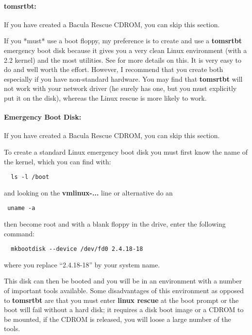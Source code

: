 \paragraph*{tomsrtbt:}

If you have created a Bacula Rescue CDROM, you can skip this section. 

If you *must* use a boot floppy, my preference is to create and use a {\bf
tomsrtbt} emergency boot disk because it gives you a very clean Linux
environment (with a 2.2 kernel) and the most utilities. See 
 for more details on
this. It is very easy to do and well worth the effort. However, I recommend
that you create both especially if you have non-standard hardware. You may
find that {\bf tomsrtbt} will not work with your network driver (he surely has
one, but you must explicitly put it on the disk), whereas the Linux rescue is
more likely to work. 

\paragraph*{Emergency Boot Disk:}

If you have created a Bacula Rescue CDROM, you can skip this section. 

To create a standard Linux emergency boot disk you must first know the name of
the kernel, which you can find with: 

\footnotesize
\begin{verbatim}
  ls -l /boot
\end{verbatim}
\normalsize

and looking on the {\bf vmlinux-...} line or alternative do an 

\footnotesize
\begin{verbatim}
 uname -a
\end{verbatim}
\normalsize

then become root and with a blank floppy in the drive, enter the following
command: 

\footnotesize
\begin{verbatim}
  mkbootdisk --device /dev/fd0 2.4.18-18
\end{verbatim}
\normalsize

where you replace ``2.4.18-18'' by your system name. 

This disk can then be booted and you will be in an environment with a number
of important tools available. Some disadvantages of this environment as
opposed to {\bf tomsrtbt} are that you must enter {\bf linux rescue} at the
boot prompt or the boot will fail without a hard disk; it requires a disk boot
image or a CDROM to be mounted, if the CDROM is released, you will loose a
large number of the tools. 

